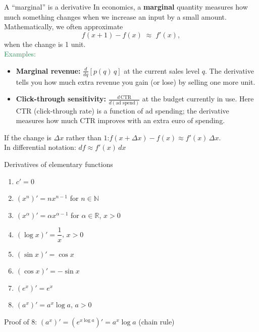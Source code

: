 \documentclass[11pt,aspectratio=169]{beamer}
\begin{document}
\begin{frame}{A ``marginal'' is a derivative}
In economics, a \textbf{marginal} quantity measures how much something changes when we increase an input by a small amount. Mathematically, we often approximate
\[
f(x+1) - f(x)\;\approx\;f'(x) ,
\]
when the change is 1 unit.\\[3mm]

\textcolor{SeaGreen}{Examples:}
\begin{itemize}
\item \textbf{Marginal revenue:} $\frac{d}{dq}[p(q)\,q]$ at the current sales level $q$.  
The derivative tells you how much extra revenue you gain (or lose) by selling one more unit.
\item \textbf{Click-through sensitivity:} $\frac{d\,\text{CTR}}{d(\text{ad spend})}$ at the budget currently in use.  
Here CTR (click-through rate) is a function of ad spending; the derivative measures how much CTR improves with an extra euro of spending.\\[4mm]
\end{itemize}

If the change is $\Delta x$ rather than $1$:\quad  $f(x+\Delta x)-f(x)\approx f'(x)\,\Delta x $.\\[3mm]
In differential notation: \quad\quad\quad\quad\quad $df \approx f'(x)\,dx$
\end{frame}



\begin{frame}{Derivatives of elementary functions}
\begin{enumerate}
\item $c' =0$
\item $(x^n)'=nx^{n-1}$ for $n\in\mathbb{N}$
\item $(x^\alpha)'=\alpha x^{\alpha-1}$ for $\alpha\in\mathbb{R}$, $x>0$
\item $(\log x)'=\dfrac{1}{x}$, $x>0$
\item $(\sin x)'=\cos x$
\item $(\cos x)'=-\sin x$
\item $(e^x)'=e^x$
\item $(a^x)'=a^x\log a$, $a>0$
\end{enumerate}
\begin{tiny}Proof of 8: $(a^x)'=(e^{x\log a})'=a^x\log a$ (chain rule)\end{tiny}
\end{frame}
\end{document}
